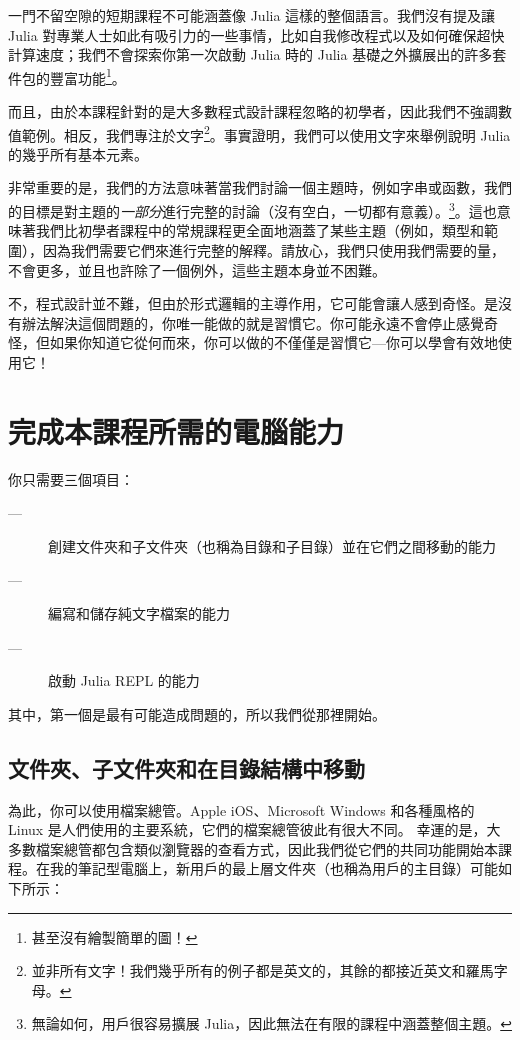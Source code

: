 \documentclass[]{article}
\begin{document}
一門不留空隙的短期課程不可能涵蓋像 Julia 這樣的整個語言。我們沒有提及讓 Julia 對專業人士如此有吸引力的一些事情，比如自我修改程式以及如何確保超快計算速度；我們不會探索你第一次啟動 Julia 時的 Julia 基礎之外擴展出的許多套件包的豐富功能\footnote{甚至沒有繪製簡單的圖！}。

而且，由於本課程針對的是大多數程式設計課程忽略的初學者，因此我們不強調數值範例。相反，我們專注於文字\footnote{並非所有文字！我們幾乎所有的例子都是英文的，其餘的都接近英文和羅馬字母。}。事實證明，我們可以使用文字來舉例說明 Julia 的幾乎所有基本元素。

非常重要的是，我們的方法意味著當我們討論一個主題時，例如字串或函數，我們的目標是對主題的\emph{一部分}進行完整的討論（沒有空白，一切都有意義）。\footnote{無論如何，用戶很容易擴展 Julia，因此無法在有限的課程中涵蓋整個主題。}。這也意味著我們比初學者課程中的常規課程更全面地涵蓋了某些主題（例如，類型和範圍），因為我們需要它們來進行完整的解釋。請放心，我們只使用我們需要的量，不會更多，並且也許除了一個例外，這些主題本身並不困難。

不，程式設計並不難，但由於形式邏輯的主導作用，它可能會讓人感到奇怪。是沒有辦法解決這個問題的，你唯一能做的就是習慣它。你可能永遠不會停止感覺奇怪，但如果你知道它從何而來，你可以做的不僅僅是習慣它---你可以學會有效地使用它！

\section*{完成本課程所需的電腦能力}

你只需要三個項目：

\begin{description}
	\item[---] 創建文件夾和子文件夾（也稱為目錄和子目錄）並在它們之間移動的能力
	\item[---] 編寫和儲存純文字檔案的能力
	\item[---] 啟動 Julia REPL 的能力
\end{description}

其中，第一個是最有可能造成問題的，所以我們從那裡開始。

\subsection*{文件夾、子文件夾和在目錄結構中移動}

為此，你可以使用檔案總管。Apple iOS、Microsoft Windows 和各種風格的 Linux 是人們使用的主要系統，它們的檔案總管彼此有很大不同。
幸運的是，大多數檔案總管都包含類似瀏覽器的查看方式，因此我們從它們的共同功能開始本課程。在我的筆記型電腦上，新用戶的最上層文件夾（也稱為用戶的主目錄）可能如下所示：
\end{document}
